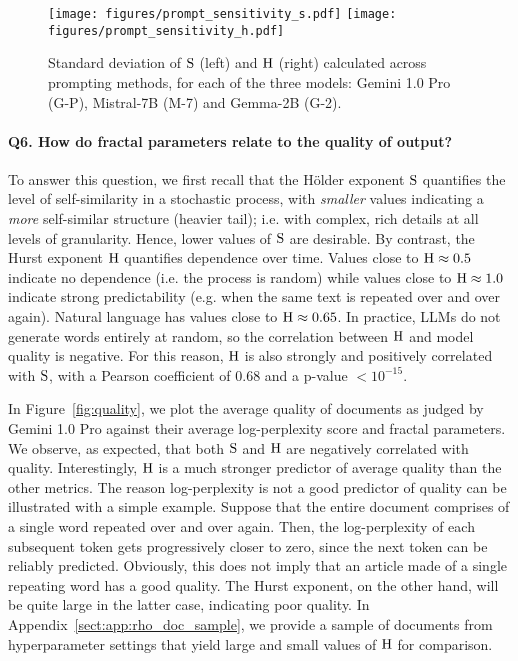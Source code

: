 \begin{figure}[t]
    \centering
    \texttt{[image: figures/prompt\_sensitivity\_s.pdf]}\hfill
    \texttt{[image: figures/prompt\_sensitivity\_h.pdf]}
    \caption{Standard deviation of $\mathrm{S}$ (left) and $\mathrm{H}$ (right) calculated across prompting methods, for each of the three models: Gemini 1.0 Pro (G-P), Mistral-7B (M-7) and Gemma-2B (G-2).}
    \label{fig:prompt_sensitivity}
\end{figure}

\paragraph{Q6. How do fractal parameters relate to the quality of output?}
To answer this question, we first recall that the H\"older exponent $\mathrm{S}$ quantifies the level of self-similarity in a stochastic process, with \emph{smaller} values indicating a \emph{more} self-similar structure (heavier tail); i.e. with complex, rich details at all levels of granularity. Hence, lower values of $\mathrm{S}$ are desirable. By contrast, the Hurst exponent $\mathrm{H}$ quantifies dependence over time. Values close to $\mathrm{H}\approx 0.5$ indicate no dependence (i.e. the process is random) while values close to $\mathrm{H}\approx 1.0$ indicate strong predictability (e.g. when the same text is repeated over and over again). Natural language has values close to $\mathrm{H}\approx 0.65$. In practice, LLMs do not generate words entirely at random, so the correlation between $\mathrm{H}$ and model quality is negative. For this reason, $\mathrm{H}$ is also strongly and positively correlated with $\mathrm{S}$, with a Pearson coefficient of 0.68 and a p-value $<10^{-15}$.  

In Figure~\ref{fig:quality}, we plot the average quality of documents as judged by Gemini 1.0 Pro against their average log-perplexity score and fractal parameters. We observe, as expected,  that both $\mathrm{S}$ and $\mathrm{H}$ are negatively correlated with quality. Interestingly, $\mathrm{H}$ is a much stronger predictor of average quality than the other metrics. The reason log-perplexity is not a good predictor of quality can be illustrated with a simple example. Suppose that the entire document comprises of a single word repeated over and over again. Then, the log-perplexity of each subsequent token gets progressively closer to zero, since the next token can be reliably predicted. Obviously, this does not imply that an article made of a single repeating word has a good quality. The Hurst exponent, on the other hand, will be quite large in the latter case, indicating poor quality. In Appendix~\ref{sect:app:rho_doc_sample}, we provide a sample of documents from hyperparameter settings that yield large and small values of $\mathrm{H}$ for comparison.

